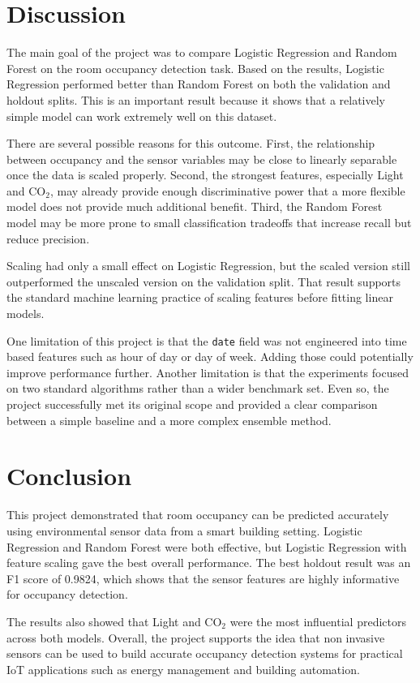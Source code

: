 \documentclass[12pt]{article}
\begin{document}
\section{Discussion}
The main goal of the project was to compare Logistic Regression and Random Forest on the room occupancy detection task. Based on the results, Logistic Regression performed better than Random Forest on both the validation and holdout splits. This is an important result because it shows that a relatively simple model can work extremely well on this dataset.

There are several possible reasons for this outcome. First, the relationship between occupancy and the sensor variables may be close to linearly separable once the data is scaled properly. Second, the strongest features, especially Light and CO$_2$, may already provide enough discriminative power that a more flexible model does not provide much additional benefit. Third, the Random Forest model may be more prone to small classification tradeoffs that increase recall but reduce precision.

Scaling had only a small effect on Logistic Regression, but the scaled version still outperformed the unscaled version on the validation split. That result supports the standard machine learning practice of scaling features before fitting linear models.

One limitation of this project is that the \texttt{date} field was not engineered into time based features such as hour of day or day of week. Adding those could potentially improve performance further. Another limitation is that the experiments focused on two standard algorithms rather than a wider benchmark set. Even so, the project successfully met its original scope and provided a clear comparison between a simple baseline and a more complex ensemble method.

\section{Conclusion}
This project demonstrated that room occupancy can be predicted accurately using environmental sensor data from a smart building setting. Logistic Regression and Random Forest were both effective, but Logistic Regression with feature scaling gave the best overall performance. The best holdout result was an F1 score of 0.9824, which shows that the sensor features are highly informative for occupancy detection.

The results also showed that Light and CO$_2$ were the most influential predictors across both models. Overall, the project supports the idea that non invasive sensors can be used to build accurate occupancy detection systems for practical IoT applications such as energy management and building automation.
\end{document}
